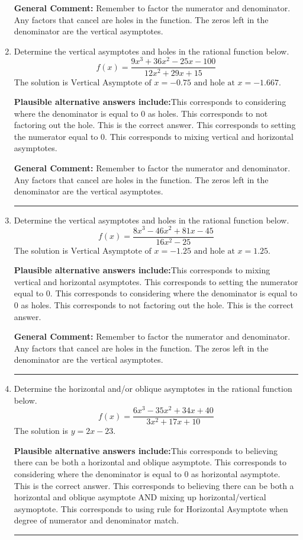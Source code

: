 \documentclass{extbook}[14pt]
\newcommand{\litem}[1]{\item #1

\rule{\textwidth}{0.4pt}}
\begin{document}
\begin{enumerate}
{\textbf{General Comment:} Remember to factor the numerator and denominator. Any factors that cancel are holes in the function. The zeros left in the denominator are the vertical asymptotes.
}
\litem{
Determine the vertical asymptotes and holes in the rational function below.
\[ f(x) = \frac{9x^{3} +36 x^{2} -25 x -100}{12x^{2} +29 x + 15} \]The solution is \( \text{Vertical Asymptote of } x = -0.75 \text{ and hole at } x = -1.667 \).\begin{enumerate}[label=\Alph*.]
\textbf{Plausible alternative answers include:}This corresponds to considering where the denominator is equal to 0 as holes.
This corresponds to not factoring out the hole.
This is the correct answer.
This corresponds to setting the numerator equal to 0.
This corresponds to mixing vertical and horizontal asymptotes.
\end{enumerate}

\textbf{General Comment:} Remember to factor the numerator and denominator. Any factors that cancel are holes in the function. The zeros left in the denominator are the vertical asymptotes.
}
\litem{
Determine the vertical asymptotes and holes in the rational function below.
\[ f(x) = \frac{8x^{3} -46 x^{2} +81 x -45}{16x^{2} -25} \]The solution is \( \text{Vertical Asymptote of } x = -1.25 \text{ and hole at } x = 1.25 \).\begin{enumerate}[label=\Alph*.]
\textbf{Plausible alternative answers include:}This corresponds to mixing vertical and horizontal asymptotes.
This corresponds to setting the numerator equal to 0.
This corresponds to considering where the denominator is equal to 0 as holes.
This corresponds to not factoring out the hole.
This is the correct answer.
\end{enumerate}

\textbf{General Comment:} Remember to factor the numerator and denominator. Any factors that cancel are holes in the function. The zeros left in the denominator are the vertical asymptotes.
}
\litem{
Determine the horizontal and/or oblique asymptotes in the rational function below.
\[ f(x) = \frac{6x^{3} -35 x^{2} +34 x + 40}{3x^{2} +17 x + 10} \]The solution is \( y = 2x -23 \).\begin{enumerate}[label=\Alph*.]
\textbf{Plausible alternative answers include:}This corresponds to believing there can be both a horizontal and oblique asymptote.
This corresponds to considering where the denominator is equal to 0 as horizontal asymptote.
This is the correct answer.
This corresponds to believing there can be both a horizontal and oblique asymptote AND mixing up horizontal/vertical asymoptote.
This corresponds to using rule for Horizontal Asymptote when degree of numerator and denominator match.
\end{enumerate}

}
\end{enumerate}
\end{document}
